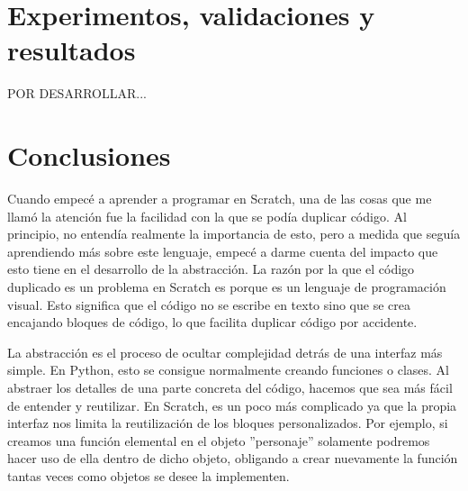 \documentclass[a4paper, 12pt]{book}
\begin{document}



\cleardoublepage
\chapter{Experimentos, validaciones y resultados}


POR DESARROLLAR...


\cleardoublepage
\chapter{Conclusiones}
\label{chap:conclusiones}

Cuando empecé a aprender a programar en Scratch, una de las cosas que me llamó la atención fue la facilidad con la que se podía duplicar código. Al principio, no entendía realmente la importancia de esto, pero a medida que seguía aprendiendo más sobre este lenguaje, empecé a darme cuenta del impacto que esto tiene en el desarrollo de la abstracción. La razón por la que el código duplicado es un problema en Scratch es porque es un lenguaje de programación visual. Esto significa que el código no se escribe en texto sino que se crea encajando bloques de código, lo que facilita duplicar código por accidente.

La abstracción es el proceso de ocultar complejidad detrás de una interfaz más simple. En Python, esto se consigue normalmente creando funciones o clases. Al abstraer los detalles de una parte concreta del código, hacemos que sea más fácil de entender y reutilizar. En Scratch, es un poco más complicado ya que la propia interfaz nos limita la reutilización de los bloques personalizados. Por ejemplo, si creamos una función elemental en el objeto ''personaje'' solamente podremos hacer uso de ella dentro de dicho objeto, obligando a crear nuevamente la función tantas veces como objetos se desee la implementen.
\end{document}
